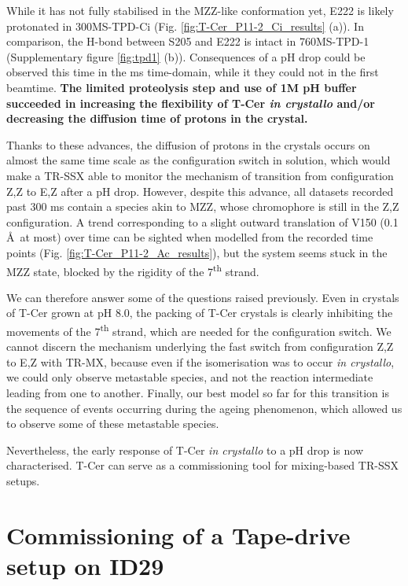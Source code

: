 While it has not fully stabilised in the MZZ-like conformation yet, E222 is likely protonated in 300MS-TPD-Ci (Fig. \ref{fig:T-Cer_P11-2_Ci_results} (a)). In comparison, the H-bond between S205 and E222 is intact in 760MS-TPD-1 (Supplementary figure \ref{fig:tpd1} (b)).  Consequences of a pH drop could be observed this time in the ms time-domain, while it they could not in the first beamtime. \textbf{The limited proteolysis step and use of 1M pH buffer succeeded in increasing the flexibility of T-Cer \textit{in crystallo} and/or decreasing the diffusion time of protons in the crystal.}

\vspace{2mm}

Thanks to these advances, the diffusion of protons in the crystals occurs on almost the same time scale as the configuration switch in solution, which would make a TR-SSX able to monitor the mechanism of transition from configuration Z,Z to E,Z after a pH drop. However, despite this advance, all datasets recorded past 300 ms contain a species akin to MZZ, whose chromophore is still in the Z,Z configuration. A trend corresponding to a slight outward translation of V150 (0.1 \AA\ at most) over time can be sighted when modelled from the recorded time points (Fig. \ref{fig:T-Cer_P11-2_Ac_results}), but the system seems stuck in the MZZ state, blocked by the rigidity of the 7\textsuperscript{th} strand.

We can therefore answer some of the questions raised previously. Even in crystals of T-Cer grown at pH 8.0, the packing of T-Cer crystals is clearly inhibiting the movements of the 7\textsuperscript{th} strand, which are needed for the configuration switch. We cannot discern the mechanism underlying the fast switch from configuration Z,Z to E,Z with TR-MX, because even if the isomerisation was to occur \textit{in crystallo}, we could only observe metastable species, and not the reaction intermediate leading from one to another. Finally, our best model so far for this transition is the sequence of events occurring during the ageing phenomenon, which allowed us to observe some of these metastable species. 

Nevertheless, the early response of T-Cer \textit{in crystallo} to a pH drop is now characterised. T-Cer can serve as a commissioning tool for mixing-based TR-SSX setups. 

\section{Commissioning of a Tape-drive setup on ID29}\label{sec:ID29}

